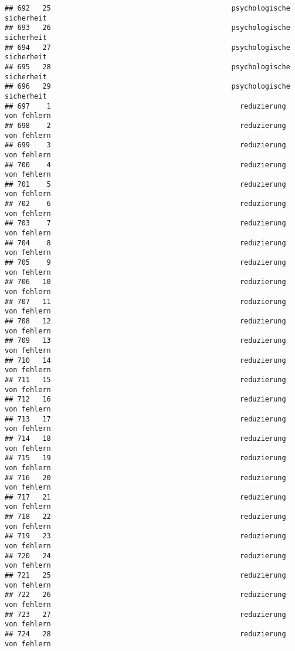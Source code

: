 \documentclass[
]{article}
\begin{document}
\begin{verbatim}
## 692   25                                           psychologische sicherheit
## 693   26                                           psychologische sicherheit
## 694   27                                           psychologische sicherheit
## 695   28                                           psychologische sicherheit
## 696   29                                           psychologische sicherheit
## 697    1                                             reduzierung von fehlern
## 698    2                                             reduzierung von fehlern
## 699    3                                             reduzierung von fehlern
## 700    4                                             reduzierung von fehlern
## 701    5                                             reduzierung von fehlern
## 702    6                                             reduzierung von fehlern
## 703    7                                             reduzierung von fehlern
## 704    8                                             reduzierung von fehlern
## 705    9                                             reduzierung von fehlern
## 706   10                                             reduzierung von fehlern
## 707   11                                             reduzierung von fehlern
## 708   12                                             reduzierung von fehlern
## 709   13                                             reduzierung von fehlern
## 710   14                                             reduzierung von fehlern
## 711   15                                             reduzierung von fehlern
## 712   16                                             reduzierung von fehlern
## 713   17                                             reduzierung von fehlern
## 714   18                                             reduzierung von fehlern
## 715   19                                             reduzierung von fehlern
## 716   20                                             reduzierung von fehlern
## 717   21                                             reduzierung von fehlern
## 718   22                                             reduzierung von fehlern
## 719   23                                             reduzierung von fehlern
## 720   24                                             reduzierung von fehlern
## 721   25                                             reduzierung von fehlern
## 722   26                                             reduzierung von fehlern
## 723   27                                             reduzierung von fehlern
## 724   28                                             reduzierung von fehlern

\end{verbatim}
\end{document}
